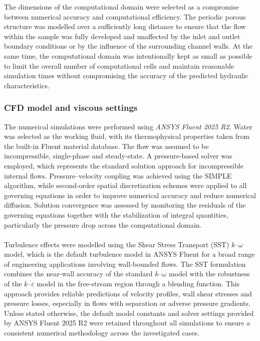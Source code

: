 \documentclass[a4paper]{article}
\begin{document}
The dimensions of the computational domain were selected as a compromise between numerical accuracy and computational efficiency. The periodic porous structure was modelled over a sufficiently long distance to ensure that the flow within the sample was fully developed and unaffected by the inlet and outlet boundary conditions or by the influence of the surrounding channel walls. At the same time, the computational domain was intentionally kept as small as possible to limit the overall number of computational cells and maintain reasonable simulation times without compromising the accuracy of the predicted hydraulic characteristics.
\pagebreak

\subsubsection{CFD model and viscous settings}
The numerical simulations were performed using \textit{ANSYS Fluent 2025 R2}. Water was selected as the working fluid, with its thermophysical properties taken from the built-in Fluent material database. The flow was assumed to be incompressible, single-phase and steady-state. A pressure-based solver was employed, which represents the standard solution approach for incompressible internal flows. Pressure--velocity coupling was achieved using the SIMPLE algorithm, while second-order spatial discretization schemes were applied to all governing equations in order to improve numerical accuracy and reduce numerical diffusion. Solution convergence was assessed by monitoring the residuals of the governing equations together with the stabilization of integral quantities, particularly the pressure drop across the computational domain.
\\
\\
Turbulence effects were modelled using the Shear Stress Transport (SST) $k$--$\omega$ model, which is the default turbulence model in ANSYS Fluent for a broad range of engineering applications involving wall-bounded flows. The SST formulation combines the near-wall accuracy of the standard $k$--$\omega$ model with the robustness of the $k$--$\varepsilon$ model in the free-stream region through a blending function. This approach provides reliable predictions of velocity profiles, wall shear stresses and pressure losses, especially in flows with separation or adverse pressure gradients. Unless stated otherwise, the default model constants and solver settings provided by ANSYS Fluent 2025 R2 were retained throughout all simulations to ensure a consistent numerical methodology across the investigated cases.
\end{document}
